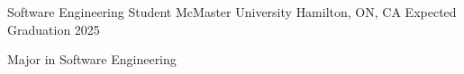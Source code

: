 

\begin{cventries}

  \cventry
    {Software Engineering Student} %
    {McMaster University} %
    {Hamilton, ON, CA} %
    {Expected Graduation 2025} %
    {
      \begin{cvitems} %
        \item {Major in Software Engineering}
      \end{cvitems}
    }

\end{cventries}
